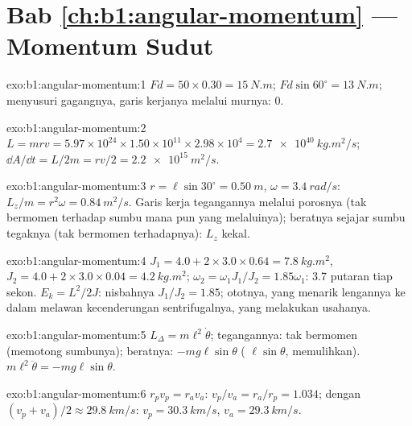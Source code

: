 \section*{Bab \ref{ch:b1:angular-momentum} --- Momentum Sudut}

\begin{solution}{exo:b1:angular-momentum:1}
$Fd = 50 \times 0.30 = \qty{15}{N.m}$; $Fd\sin 60^\circ = \qty{13}{N.m}$;
menyusuri gagangnya, garis kerjanya melalui murnya: $0$.
\end{solution}

\begin{solution}{exo:b1:angular-momentum:2}
$L = mrv = 5.97\times10^{24} \times 1.50\times10^{11} \times 2.98\times10^4 =
\qty{2.7e40}{kg.m^2/s}$; $\dd A/\dd t = L/2m = rv/2 = \qty{2.2e15}{m^2/s}$.
\end{solution}

\begin{solution}{exo:b1:angular-momentum:3}
$r = \ell\sin 30^\circ = \qty{0.50}{m}$, $\omega = \qty{3.4}{rad/s}$:
$L_z/m = r^2\omega = \qty{0.84}{m^2/s}$. Garis kerja tegangannya melalui
porosnya (tak bermomen terhadap sumbu mana pun yang melaluinya);
beratnya sejajar sumbu tegaknya (tak bermomen terhadapnya): $L_z$ kekal.
\end{solution}

\begin{solution}{exo:b1:angular-momentum:4}
$J_1 = 4.0 + 2 \times 3.0 \times 0.64 = \qty{7.8}{kg.m^2}$, $J_2 = 4.0 +
2 \times 3.0 \times 0.04 = \qty{4.2}{kg.m^2}$; $\omega_2 = \omega_1J_1/J_2 =
1.85\omega_1$: \qty{3.7}{} putaran tiap sekon. $E_k = L^2/2J$: nisbahnya
$J_1/J_2 = 1.85$; ototnya, yang menarik lengannya ke dalam melawan
kecenderungan sentrifugalnya, yang melakukan usahanya.
\end{solution}

\begin{solution}{exo:b1:angular-momentum:5}
$L_\Delta = m\ell^2\dot\theta$; tegangannya: tak bermomen (memotong
sumbunya); beratnya: $-mg\ell\sin\theta$ (
$\ell\sin\theta$, memulihkan). $m\ell^2\ddot\theta = -mg\ell\sin\theta$.
\end{solution}

\begin{solution}{exo:b1:angular-momentum:6}
$r_pv_p = r_av_a$: $v_p/v_a = r_a/r_p = 1.034$; dengan $(v_p + v_a)/2 \approx
\qty{29.8}{km/s}$: $v_p = \qty{30.3}{km/s}$, $v_a = \qty{29.3}{km/s}$.
\end{solution}

